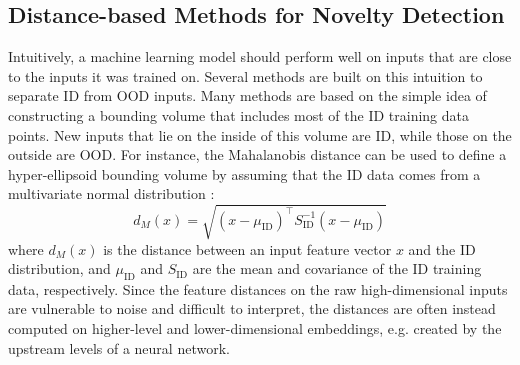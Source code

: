\subsection{Distance-based Methods for Novelty Detection} \label{txt:ood-distance}

Intuitively, a machine learning model should perform well on inputs that are close to the inputs it was trained on. Several methods are built on this intuition to separate ID from OOD inputs. Many methods are based on the simple idea of constructing a bounding volume that includes most of the ID training data points. New inputs that lie on the inside of this volume are ID, while those on the outside are OOD. For instance, the Mahalanobis distance can be used to define a hyper-ellipsoid bounding volume by assuming that the ID data comes from a multivariate normal distribution \cite{mahalanobis-distance-1936, mahalanobis-outlier-2000}:
\begin{equation} \label{eq:mahalanobis-distance}
    d_{M}(x) = \sqrt{(x - \mu_{\text{ID}})^{\intercal} S^{-1}_{\text{ID}} (x - \mu_{\text{ID}})}
\end{equation}
where $d_{M}(x)$ is the distance between an input feature vector $x$ and the ID distribution, and $\mu_{\text{ID}}$ and $S_{\text{ID}}$ are the mean and covariance of the ID training data, respectively. Since the feature distances on the raw high-dimensional inputs are vulnerable to noise and difficult to interpret, the distances are often instead computed on higher-level and lower-dimensional embeddings, e.g. created by the upstream levels of a neural network.

